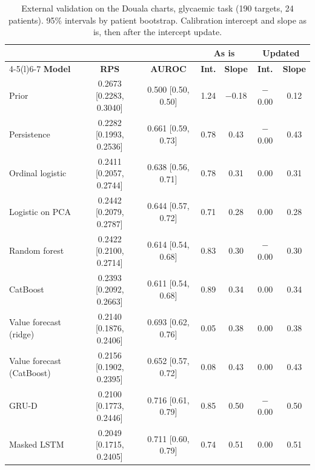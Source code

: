 \begin{table}[htbp]
\centering\footnotesize
\caption{External validation on the Douala charts, glycaemic task (190 targets, 24 patients). 95\% intervals by patient bootstrap. Calibration intercept and slope as is, then after the intercept update.}\label{tab:ext-glycaemic}
\begin{tabular}{@{}lcccccc@{}}
\toprule
 & & & \multicolumn{2}{c}{\textbf{As is}} & \multicolumn{2}{c}{\textbf{Updated}} \\
\cmidrule(lr){4-5}\cmidrule(l){6-7}
\textbf{Model} & \textbf{RPS} & \textbf{AUROC} & \textbf{Int.} & \textbf{Slope} & \textbf{Int.} & \textbf{Slope} \\
\midrule
Prior & 0.2673 [0.2283, 0.3040] & 0.500 [0.50, 0.50] & 1.24 & $-$0.18 & $-$0.00 & 0.12 \\
Persistence & 0.2282 [0.1993, 0.2536] & 0.661 [0.59, 0.73] & 0.78 & 0.43 & $-$0.00 & 0.43 \\
Ordinal logistic & 0.2411 [0.2057, 0.2744] & 0.638 [0.56, 0.71] & 0.78 & 0.31 & 0.00 & 0.31 \\
Logistic on PCA & 0.2442 [0.2079, 0.2787] & 0.644 [0.57, 0.72] & 0.71 & 0.28 & 0.00 & 0.28 \\
Random forest & 0.2422 [0.2100, 0.2714] & 0.614 [0.54, 0.68] & 0.83 & 0.30 & $-$0.00 & 0.30 \\
CatBoost & 0.2393 [0.2092, 0.2663] & 0.611 [0.54, 0.68] & 0.89 & 0.34 & 0.00 & 0.34 \\
Value forecast (ridge) & 0.2140 [0.1876, 0.2406] & 0.693 [0.62, 0.76] & 0.05 & 0.38 & 0.00 & 0.38 \\
Value forecast (CatBoost) & 0.2156 [0.1902, 0.2395] & 0.652 [0.57, 0.72] & 0.08 & 0.43 & 0.00 & 0.43 \\
GRU-D & 0.2100 [0.1773, 0.2446] & 0.716 [0.61, 0.79] & 0.85 & 0.50 & $-$0.00 & 0.50 \\
Masked LSTM & 0.2049 [0.1715, 0.2405] & 0.711 [0.60, 0.79] & 0.74 & 0.51 & 0.00 & 0.51 \\
\bottomrule
\end{tabular}
\end{table}
